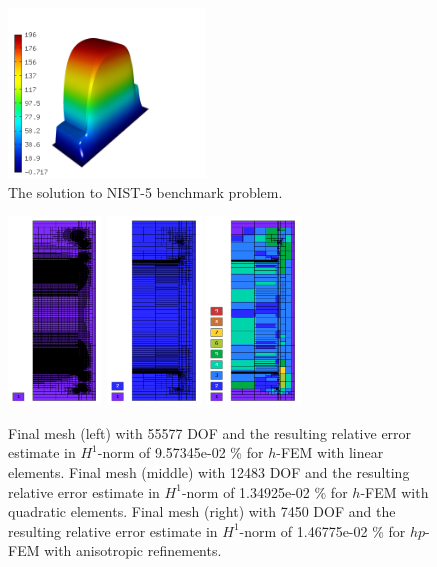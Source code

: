 \documentclass[12pt]{elsarticle}
\begin{document}
\begin{figure}[H]
\centering
\includegraphics[height=4.5cm]{nist/nist-5/solution.png}
\caption{The solution to NIST-5 benchmark problem.}
\label{fig:sln-nist05}
\end{figure}

\begin{figure}[H]
\centering
\vspace{-3mm}
\includegraphics[height=5cm]{nist/nist-5/mesh_h1_aniso.png}
\includegraphics[height=5cm]{nist/nist-5/mesh_h2_aniso.png}
\includegraphics[height=5cm]{nist/nist-5/mesh_hp_aniso.png}
\vspace{-3mm}
\caption{
Final mesh (left) with 55577 DOF and the resulting
relative error estimate in $H^1$-norm of 9.57345e-02 \% for $h$-FEM with linear elements.
Final mesh (middle) with 12483 DOF and the resulting
relative error estimate in $H^1$-norm of 1.34925e-02 \% for $h$-FEM with quadratic elements.
Final mesh (right) with 7450 DOF and the resulting
relative error estimate in $H^1$-norm of 1.46775e-02 \% for $hp$-FEM with anisotropic refinements.}
\label{fig:nist-5-hp-aniso}
\end{figure}
\end{document}
